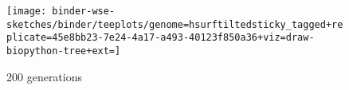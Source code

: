 \begin{figure*}
  \centering
  \texttt{[image: binder-wse-sketches/binder/teeplots/genome=hsurftiltedsticky\_tagged+replicate=45e8bb23-7e24-4a17-a493-40123f850a36+viz=draw-biopython-tree+ext=]}
  \caption{200 generations}
  \label{fig:tagged_200}
\end{figure*}
